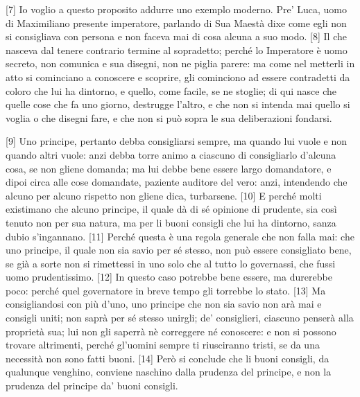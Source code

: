{[}7{]} Io voglio a questo proposito addurre uno exemplo moderno. Pre'
Luca, uomo di Maximiliano presente imperatore, parlando di Sua Maestà
dixe come egli non si consigliava con persona e non faceva mai di cosa
alcuna a suo modo. {[}8{]} Il che nasceva dal tenere contrario termine
al sopradetto; perché lo Imperatore è uomo secreto, non comunica e sua
disegni, non ne piglia parere: ma come nel metterli in atto si
cominciano a conoscere e scoprire, gli cominciono ad essere contradetti
da coloro che lui ha dintorno, e quello, come facile, se ne stoglie; di
qui nasce che quelle cose che fa uno giorno, destrugge l'altro, e che
non si intenda mai quello si voglia o che disegni fare, e che non si può
sopra le sua deliberazioni fondarsi.

{[}9{]} Uno principe, pertanto debba consigliarsi sempre, ma quando lui
vuole e non quando altri vuole: anzi debba torre animo a ciascuno di
consigliarlo d'alcuna cosa, se non gliene domanda; ma lui debbe bene
essere largo domandatore, e dipoi circa alle cose domandate, paziente
auditore del vero: anzi, intendendo che alcuno per alcuno rispetto non
gliene dica, turbarsene. {[}10{]} E perché molti existimano che alcuno
principe, il quale dà di sé opinione di prudente, sia così tenuto non
per sua natura, ma per li buoni consigli che lui ha dintorno, sanza
dubio s'ingannano. {[}11{]} Perché questa è una regola generale che non
falla mai: che uno principe, il quale non sia savio per sé stesso, non
può essere consigliato bene, se già a sorte non si rimettessi in uno
solo che al tutto lo governassi, che fussi uomo prudentissimo. {[}12{]}
In questo caso potrebbe bene essere, ma durerebbe poco: perché quel
governatore in breve tempo gli torrebbe lo stato. {[}13{]} Ma
consigliandosi con più d'uno, uno principe che non sia savio non arà mai
e consigli uniti; non saprà per sé stesso unirgli; de' consiglieri,
ciascuno penserà alla proprietà sua; lui non gli saperrà nè correggere
né conoscere: e non si possono trovare altrimenti, perché gl'uomini
sempre ti riusciranno tristi, se da una necessità non sono fatti buoni.
{[}14{]} Però si conclude che li buoni consigli, da qualunque venghino, conviene naschino dalla prudenza del principe, e non la prudenza del principe da' buoni consigli.


